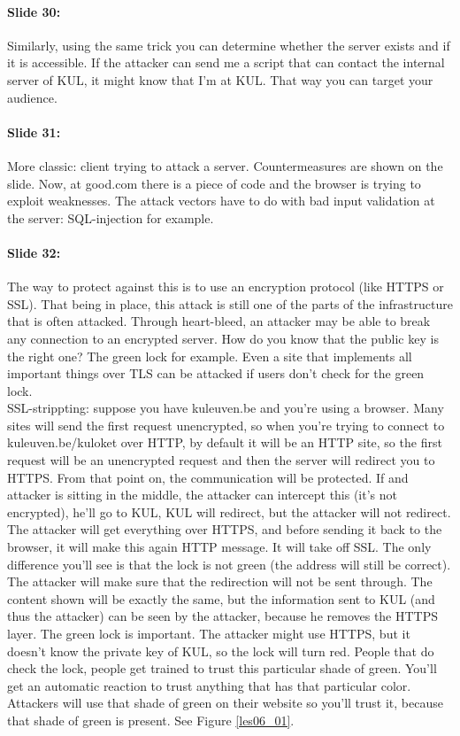 \documentclass[10pt,a4paper]{report}
\begin{document}
\paragraph{Slide 30:} Similarly, using the same trick you can determine whether the server exists and if it is accessible. If the attacker can send me a script that can contact the internal server of KUL, it might know that I'm at KUL. That way you can target your audience.

\paragraph{Slide 31:} More classic: client trying to attack a server. Countermeasures are shown on the slide. Now, at good.com there is a piece of code and the browser is trying to exploit weaknesses. The attack vectors have to do with bad input validation at the server: SQL-injection for example.

\paragraph{Slide 32:} The way to protect against this is to use an encryption protocol (like HTTPS or SSL). That being in place, this attack is still one of the parts of the infrastructure that is often attacked. Through heart-bleed, an attacker may be able to break any connection to an encrypted server. How do you know that the public key is the right one? The green lock for example. Even a site that implements all important things over TLS can be attacked if users don't check for the green lock.\\
SSL-strippting: suppose you have kuleuven.be and you're using a browser. Many sites will send the first request unencrypted, so when you're trying to connect to kuleuven.be/kuloket over HTTP, by default it will be an HTTP site, so the first request will be an unencrypted request and then the server will redirect you to HTTPS. From that point on, the communication will be protected. If and attacker is sitting in the middle, the attacker can intercept this (it's not encrypted), he'll go to KUL, KUL will redirect, but the attacker will not redirect. The attacker will get everything over HTTPS, and before sending it back to the browser, it will make this again HTTP message. It will take off SSL. The only difference you'll see is that the lock is not green (the address will still be correct). The attacker will make sure that the redirection will not be sent through. The content shown will be exactly the same, but the information sent to KUL (and thus the attacker) can be seen by the attacker, because he removes the HTTPS layer. The green lock is important. The attacker might use HTTPS, but it doesn't know the private key of KUL, so the lock will turn red.
People that do check the lock, people get trained to trust this particular shade of green. You'll get an automatic reaction to trust anything that has that particular color. Attackers will use that shade of green on their website so you'll trust it, because that shade of green is present. See Figure \ref{les06_01}.
\end{document}
